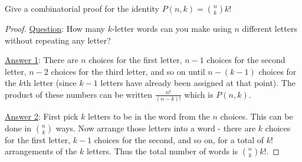 \begin{questions}
	
	
\question Give a combinatorial proof for the identity $P(n,k) = {n \choose k}k!$
	
	\begin{answer}
		\begin{proof}
         \underline{Question}: How many $k$-letter words can you make using $n$ different letters without repeating any letter?
         
         \underline{Answer 1}: There are $n$ choices for the first letter, $n-1$ choices for the second letter, $n-2$ choices for the third letter, and so on until $n - (k-1)$ choices for the $k$th letter (since $k-1$ letters have already been assigned at that point).  The product of these numbers can be written $\frac{n!}{(n-k)!}$ which is $P(n,k)$.
         
         \underline{Answer 2}: First pick $k$ letters to be in the word from the $n$ choices.  This can be done in ${n \choose k}$ ways.  Now arrange those letters into a word - there are $k$ choices for the first letter, $k-1$ choices for the second, and so on, for a total of $k!$ arrangements of the $k$ letters.  Thus the total number of words is ${n \choose k}k!$.
        \end{proof}
	\end{answer}
	
	
	

\end{questions}


